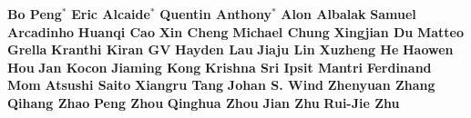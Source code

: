 \begin{center}
\textbf{Bo Peng}$^*$\quad
\textbf{Eric Alcaide}$^*$\quad
\textbf{Quentin Anthony}$^*$\quad
\textbf{Alon Albalak}\quad
\textbf{Samuel Arcadinho}\quad
\textbf{Huanqi Cao}\quad
\textbf{Xin Cheng}\quad
\textbf{Michael Chung}\quad
\textbf{Xingjian Du}\quad
\textbf{Matteo Grella}\quad
\textbf{Kranthi Kiran GV}\quad
\textbf{Hayden Lau}\quad
\textbf{Jiaju Lin}\quad
\textbf{Xuzheng He}\quad
\textbf{Haowen Hou}\quad
\textbf{Jan Kocon}\quad
\textbf{Jiaming Kong}\quad
\textbf{Krishna Sri Ipsit Mantri}\quad
\textbf{Ferdinand Mom}\quad
\textbf{Atsushi Saito}\quad
\textbf{Xiangru Tang}\quad
\textbf{Johan S. Wind}\quad
\textbf{Zhenyuan Zhang}\quad
\textbf{Qihang Zhao}\quad
\textbf{Peng Zhou}\quad
\textbf{Qinghua Zhou}\quad
\textbf{Jian Zhu}\quad
\textbf{Rui-Jie Zhu}\quad
\end{center}